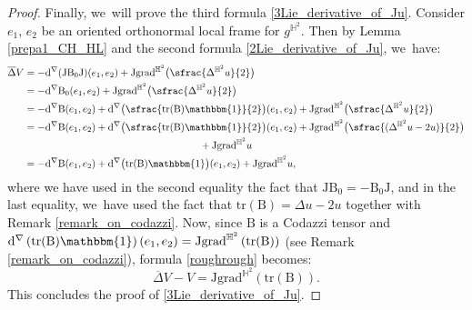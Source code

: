 \documentclass[JEP,XML,SOM,Unicode,NoEqCountersInSection, NoFloatCountersInSection,published]{cedram}
\newcommand{\psfrac}[2]{\sfrac{(#1)}{#2}}
\theoremstyle{plain}
\theoremstyle{definition}
\newcommand{\grad}{\mathrm{grad}^{\mathbb{H}^2}}
\newcommand{\J}{\mathrm{J}}
\newcommand{\B}{\mathrm{B}}
\begin{document}
\begin{proof}
Finally, we~will prove the third formula \eqref{3Lie_derivative_of_Ju}. Consider $e_1$, $e_2$ be an oriented orthonormal local frame for $g^{\mathbb{H}^2}$. Then by Lemma \ref{prepa1_CH_HL} and the second formula \eqref{2Lie_derivative_of_Ju}, we~have:
\begin{equation}\label{roughrough}
\begin{split}
\overline{\Delta}V&=-\mathrm{d}^{\nabla}(\J\B_0\J)(e_1,e_2)+\J\grad\bigl(\sfrac{\Delta^{\mathbb{H}^2} u}{2}\bigr)\\
&=-\mathrm{d}^{\nabla}\B_0(e_1,e_2)+\J\grad\bigl(\sfrac{\Delta^{\mathbb{H}^2} u}{2}\bigr)\\
&= -\mathrm{d}^{\nabla}\B(e_1,e_2)+\mathrm{d}^{\nabla}\bigl(\sfrac{\mathrm{tr}(\B)\mathbbm{1}}{2} \bigr)(e_1,e_2)+ \J\grad\bigl(\sfrac{\Delta^{\mathbb{H}^2} u}{2}\bigr)\\
&=-\mathrm{d}^{\nabla}\B(e_1,e_2)+\mathrm{d}^{\nabla}\bigl(\sfrac{\mathrm{tr}(\B)\mathbbm{1}}{2} \bigr)(e_1,e_2)+ \J\grad\bigl(\psfrac{\Delta^{\mathbb{H}^2} u-2u}{2}\bigr)\\
&\hspace*{6.15cm}+ \J\grad u \\
&=-\mathrm{d}^{\nabla}\B(e_1,e_2)+\mathrm{d}^{\nabla}\bigl(\mathrm{tr}(\B)\mathbbm{1}\bigr)(e_1,e_2)+ \J\grad u,
\end{split}
\end{equation}
where we have used in the second equality the fact that \(\J\B_0 = -\B_0\J\), and in the last equality, we~have used the fact that \(\mathrm{tr}(\B) = \Delta u - 2u\) together with Remark \ref{remark_on_codazzi}. Now, since \(\B\) is a Codazzi tensor and \(\mathrm{d}^{\nabla}\left(\mathrm{tr}(\B)\mathbbm{1} \right)(e_1,e_2) = \J\grad\left(\mathrm{tr}(\B)\right)\) (see Remark \ref{remark_on_codazzi}), formula \eqref{roughrough} becomes:
\begin{equation}\label{Tension_Ju}
\overline{\Delta}V-V=\J\grad\left(\mathrm{tr}(\B) \right).
\end{equation}
This concludes the proof of \eqref{3Lie_derivative_of_Ju}.
\end{proof}
\end{document}
